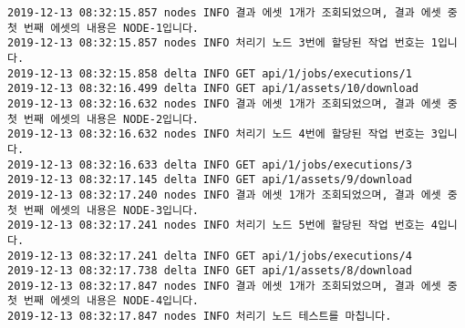 \begin{Verbatim}[fontsize=\tiny, breaklines=true, breakanywhere=true]
2019-12-13 08:32:15.857 nodes INFO 결과 에셋 1개가 조회되었으며, 결과 에셋 중 첫 번째 에셋의 내용은 NODE-1입니다.
2019-12-13 08:32:15.857 nodes INFO 처리기 노드 3번에 할당된 작업 번호는 1입니다.
2019-12-13 08:32:15.858 delta INFO GET api/1/jobs/executions/1
2019-12-13 08:32:16.499 delta INFO GET api/1/assets/10/download
2019-12-13 08:32:16.632 nodes INFO 결과 에셋 1개가 조회되었으며, 결과 에셋 중 첫 번째 에셋의 내용은 NODE-2입니다.
2019-12-13 08:32:16.632 nodes INFO 처리기 노드 4번에 할당된 작업 번호는 3입니다.
2019-12-13 08:32:16.633 delta INFO GET api/1/jobs/executions/3
2019-12-13 08:32:17.145 delta INFO GET api/1/assets/9/download
2019-12-13 08:32:17.240 nodes INFO 결과 에셋 1개가 조회되었으며, 결과 에셋 중 첫 번째 에셋의 내용은 NODE-3입니다.
2019-12-13 08:32:17.241 nodes INFO 처리기 노드 5번에 할당된 작업 번호는 4입니다.
2019-12-13 08:32:17.241 delta INFO GET api/1/jobs/executions/4
2019-12-13 08:32:17.738 delta INFO GET api/1/assets/8/download
2019-12-13 08:32:17.847 nodes INFO 결과 에셋 1개가 조회되었으며, 결과 에셋 중 첫 번째 에셋의 내용은 NODE-4입니다.
2019-12-13 08:32:17.847 nodes INFO 처리기 노드 테스트를 마칩니다.    
\end{Verbatim}

